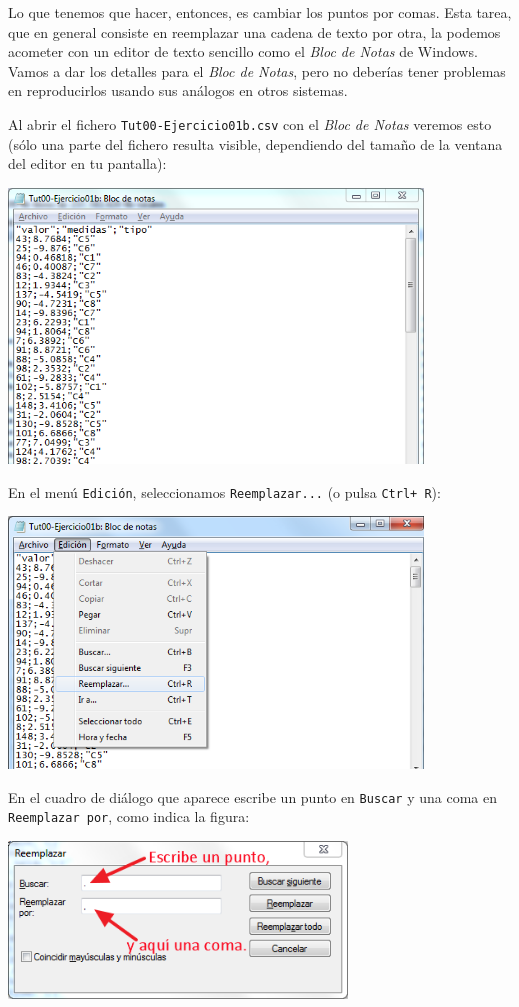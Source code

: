 \documentclass[10pt,a4paper]{article}\usepackage[]{graphicx}\usepackage[]{color}
\begin{document}
Lo que tenemos que hacer, entonces, es cambiar los puntos por comas. Esta tarea, que en general
consiste en reemplazar una cadena de texto por otra, la podemos acometer con un editor de texto
sencillo como el {\em Bloc de Notas} de Windows. Vamos a dar los detalles para el {\em Bloc de
Notas}, pero no deberías tener problemas en reproducirlos  usando sus análogos en otros sistemas.

Al abrir el fichero {\tt Tut00-Ejercicio01b.csv} con el {\em Bloc de Notas} veremos esto (sólo una
parte del fichero resulta visible, dependiendo del tamaño de la ventana del editor en tu pantalla):
        \begin{center}
        \includegraphics[width=11cm]{../fig/Tut00-EjercicioI-a.png}
        \end{center}
En el menú {\tt Edición}, seleccionamos {\tt Reemplazar...} (o pulsa {\tt Ctrl+ R}):
        \begin{center}
        \includegraphics[width=11cm]{../fig/Tut00-EjercicioI-b.png}
        \end{center}
En el cuadro de diálogo que aparece escribe un punto en {\tt Buscar} y una coma en {\tt Reemplazar
por}, como indica la figura:
        \begin{center}
        \includegraphics[width=9cm]{../fig/Tut00-EjercicioI-c.png}
        \end{center}
\end{document}
